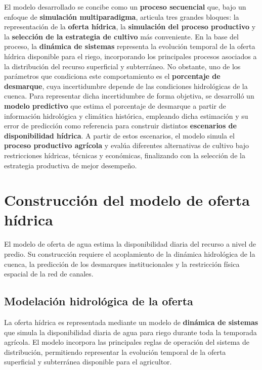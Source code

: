 \documentclass[12pt]{report}
\begin{document}
El modelo desarrollado se concibe como un \textbf{proceso secuencial} que, bajo un enfoque de \textbf{simulación multiparadigma}, articula tres grandes bloques: la representación de la \textbf{oferta hídrica}, la \textbf{simulación del proceso productivo} y la \textbf{selección de la estrategia de cultivo} más conveniente. En la base del proceso, la \textbf{dinámica de sistemas} representa la evolución temporal de la oferta hídrica disponible para el riego, incorporando los principales procesos asociados a la distribución del recurso superficial y subterráneo. No obstante, uno de los parámetros que condiciona este comportamiento es el \textbf{porcentaje de desmarque}, cuya incertidumbre depende de las condiciones hidrológicas de la cuenca. Para representar dicha incertidumbre de forma objetiva, se desarrolló un \textbf{modelo predictivo} que estima el porcentaje de desmarque a partir de información hidrológica y climática histórica, empleando dicha estimación y su error de predicción como referencia para construir distintos \textbf{escenarios de disponibilidad hídrica}. A partir de estos escenarios, el modelo simula el \textbf{proceso productivo agrícola} y evalúa diferentes alternativas de cultivo bajo restricciones hídricas, técnicas y económicas, finalizando con la selección de la estrategia productiva de mejor desempeño.

\section{Construcción del modelo de oferta hídrica}

El modelo de oferta de agua estima la disponibilidad diaria del recurso a nivel de predio. Su construcción requiere el acoplamiento de la dinámica hidrológica de la cuenca, la predicción de los desmarques institucionales y la restricción física espacial de la red de canales.

\subsection{Modelación hidrológica de la oferta}

La oferta hídrica es representada mediante un modelo de \textbf{dinámica de sistemas} que simula la disponibilidad diaria de agua para riego durante toda la temporada agrícola. El modelo incorpora las principales reglas de operación del sistema de distribución, permitiendo representar la evolución temporal de la oferta superficial y subterránea disponible para el agricultor.
\end{document}
